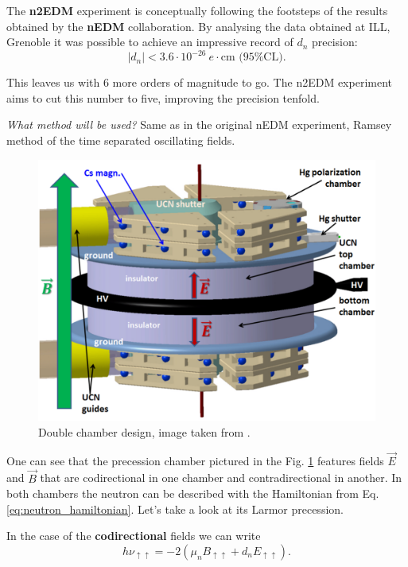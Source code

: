 The \textbf{n2EDM} experiment is conceptually following the footsteps of the results obtained by the \textbf{nEDM} collaboration. By analysing the data obtained at ILL, Grenoble it was possible to achieve \cite{Pendlebury2015} an impressive record of $d_n$ precision:
\begin{equation}
	\left| d_n \right| < 3.6 \cdot 10^{-26}\ e \cdot \text{cm (95\% CL)}.
\end{equation}

This leaves us with 6 more orders of magnitude to go. The n2EDM experiment aims to cut this number to five, improving \cite{Abel2018} the precision tenfold.

\textit{What method will be used?} Same as in the original nEDM experiment, Ramsey method of the time separated oscillating fields.%
\begin{figure}[h]
	\includegraphics[width=\textwidth]{img/n2edm_chamber}
	\caption{Double chamber design, image taken from \cite{Abel2018}.}
	\label{fig:precession_chamber}
\end{figure}

One can see that the precession chamber pictured in the Fig. \ref{fig:precession_chamber} features fields $\vec{E}$ and $\vec{B}$ that are codirectional in one chamber and contradirectional in another. In both chambers the neutron can be described with the Hamiltonian from Eq. \ref{eq:neutron_hamiltonian}. Let's take a look at its Larmor precession.

In the case of the \textbf{codirectional} fields we can write
\begin{equation}
	h\nu_{\uparrow \uparrow} = -2 \left( \mu_n B_{\uparrow \uparrow} + d_n E_{\uparrow \uparrow} \right).
	\label{eq:larmor_codirectional}
\end{equation}

